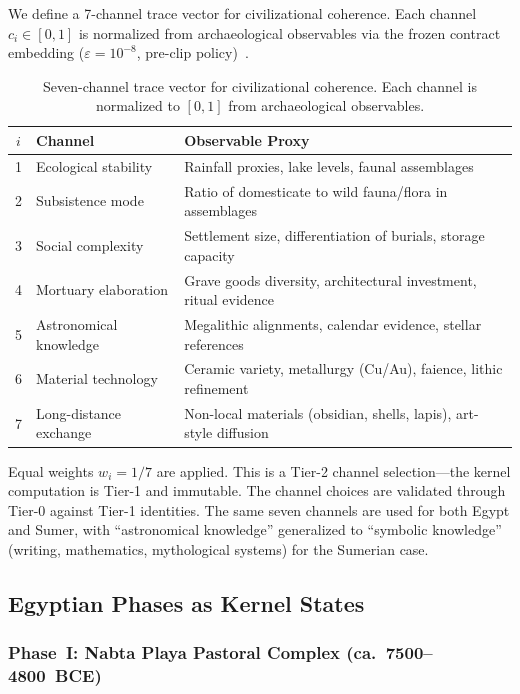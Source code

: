 \documentclass[
  aps,
  prd,
  twocolumn,
  superscriptaddress,
  nofootinbib,
  floatfix
]{revtex4-2}
\newcommand{\eps}{\varepsilon}
\begin{document}
We define a 7-channel trace vector for civilizational
coherence.  Each channel $c_i \in [0,1]$ is normalized
from archaeological observables via the frozen contract
embedding ($\eps = 10^{-8}$, pre-clip
policy)~\cite{paulus2025umcp}.

\begin{table}[h]
\centering
\caption{Seven-channel trace vector for civilizational
coherence.  Each channel is normalized to $[0,1]$ from
archaeological observables.}
\label{tab:channels}
\begin{tabular}{@{}clP{4.2cm}@{}}
\toprule
$i$ & Channel & Observable Proxy \\
 & Ecological stability & Rainfall proxies, lake levels, faunal assemblages \\
2 & Subsistence mode & Ratio of domesticate to wild fauna/flora in assemblages \\
3 & Social complexity & Settlement size, differentiation of burials, storage capacity \\
4 & Mortuary elaboration & Grave goods diversity, architectural investment, ritual evidence \\
5 & Astronomical knowledge & Megalithic alignments, calendar evidence, stellar references \\
6 & Material technology & Ceramic variety, metallurgy (Cu/Au), faience, lithic refinement \\
7 & Long-distance exchange & Non-local materials (obsidian, shells, lapis), art-style diffusion \\
\bottomrule
\end{tabular}
\end{table}

Equal weights $w_i = 1/7$ are applied.  This is a Tier-2
channel selection---the kernel computation is Tier-1 and
immutable.  The channel choices are validated through
Tier-0 against Tier-1 identities.  The same seven
channels are used for both Egypt and Sumer, with
``astronomical knowledge'' generalized to ``symbolic
knowledge'' (writing, mathematics, mythological
systems) for the Sumerian case.


\subsection{Egyptian Phases as Kernel
States}\label{sec:phases}

\subsubsection{Phase~I: Nabta Playa Pastoral Complex
(ca.\ 7500--4800~BCE)}\label{sec:nabta}
\end{document}
